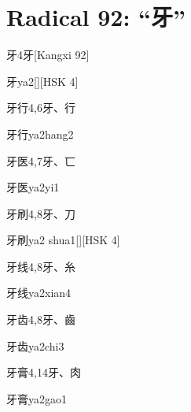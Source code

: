 
\section*{Radical 92: ``⽛''}

\begin{Entry}{牙}{4}{⽛}[Kangxi 92]
  \begin{Phonetics}{牙}{ya2}[][HSK 4]
  \end{Phonetics}
\end{Entry}

\begin{Entry}{牙行}{4,6}{⽛、⾏}
  \begin{Phonetics}{牙行}{ya2hang2}
  \end{Phonetics}
\end{Entry}

\begin{Entry}{牙医}{4,7}{⽛、⼖}
  \begin{Phonetics}{牙医}{ya2yi1}
  \end{Phonetics}
\end{Entry}

\begin{Entry}{牙刷}{4,8}{⽛、⼑}
  \begin{Phonetics}{牙刷}{ya2 shua1}[][HSK 4]
  \end{Phonetics}
\end{Entry}

\begin{Entry}{牙线}{4,8}{⽛、⽷}
  \begin{Phonetics}{牙线}{ya2xian4}
  \end{Phonetics}
\end{Entry}

\begin{Entry}{牙齿}{4,8}{⽛、⿒}
  \begin{Phonetics}{牙齿}{ya2chi3}
  \end{Phonetics}
\end{Entry}

\begin{Entry}{牙膏}{4,14}{⽛、⾁}
  \begin{Phonetics}{牙膏}{ya2gao1}
  \end{Phonetics}
\end{Entry}


